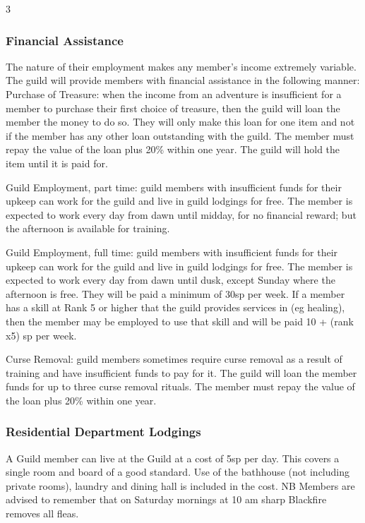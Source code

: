 \begin{multicols}{3}
\subsubsection{Financial Assistance}

The nature of their employment makes any member’s income extremely
variable. The guild will provide members with financial assistance in
the following manner: Purchase of Treasure: when the income from an
adventure is insufficient for a member to purchase their first choice
of treasure, then the guild will loan the member the money to do
so. They will only make this loan for one item and not if the member
has any other loan outstanding with the guild. The member must repay
the value of the loan plus 20\% within one year. The guild will hold
the item until it is paid for.

Guild Employment, part time: guild members with insufficient funds for
their upkeep can work for the guild and live in guild lodgings for
free. The member is expected to work every day from dawn until midday,
for no financial reward; but the afternoon is available for training.

Guild Employment, full time: guild members with insufficient funds for
their upkeep can work for the guild and live in guild lodgings for
free. The member is expected to work every day from dawn until dusk,
except Sunday where the afternoon is free. They will be paid a minimum
of 30sp per week. If a member has a skill at Rank 5 or higher that the
guild provides services in (eg healing), then the member may be
employed to use that skill and will be paid 10 + (rank x5) sp per
week.

Curse Removal: guild members sometimes require curse removal as a
result of training and have insufficient funds to pay for it. The
guild will loan the member funds for up to three curse removal
rituals. The member must repay the value of the loan plus 20\% within
one year.

\subsubsection{Residential Department Lodgings}

A Guild member can live at the Guild at a cost of 5sp per day. This
covers a single room and board of a good standard. Use of the
bathhouse (not including private rooms), laundry and dining hall is
included in the cost.  NB Members are advised to remember that on
Saturday mornings at 10 am sharp Blackfire removes all fleas.


\end{multicols}
